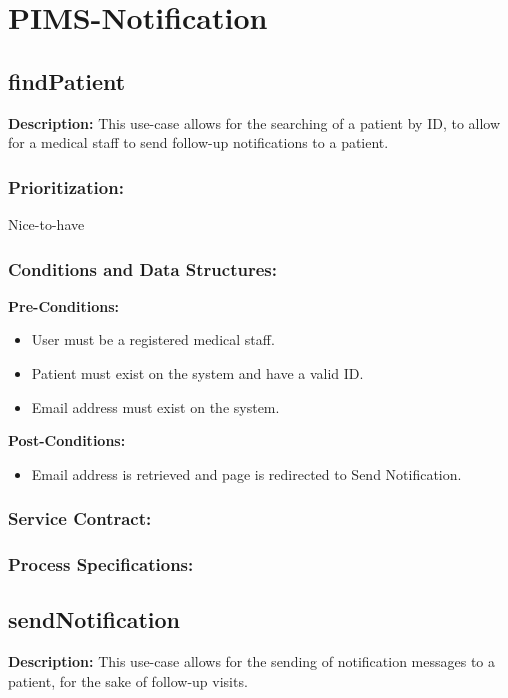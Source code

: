 \documentclass[a4paper,12pt,titlepage]{article}
\begin{document}
\section{PIMS-Notification}

\subsection{findPatient}
\textbf{Description:}
This use-case allows for the searching of a patient by ID, to allow for a medical staff to send follow-up notifications to a patient.
\subsubsection{Prioritization:}
Nice-to-have
\subsubsection{Conditions and Data Structures:}
\textbf{Pre-Conditions:}
\begin{itemize}
	\item User must be a registered medical staff.
	\item Patient must exist on the system and have a valid ID.
	\item Email address must exist on the system.
\end{itemize}

\textbf{Post-Conditions:}	
\begin{itemize}
	\item Email address is retrieved and page is redirected to Send Notification.
\end{itemize}
\subsubsection{Service Contract:} 
\subsubsection{Process Specifications:} 


\subsection{sendNotification}
\textbf{Description:}
This use-case allows for the sending of notification messages to a patient, for the sake of follow-up visits.
\end{document}

